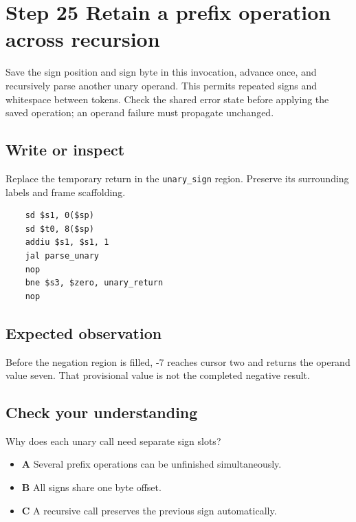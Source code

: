 \section{Step 25 Retain a prefix operation across recursion}\label{expression-s25}

Save the sign position and sign byte in this invocation, advance once, and recursively parse another unary operand. This permits repeated signs and whitespace between tokens. Check the shared error state before applying the saved operation; an operand failure must propagate unchanged.

\subsection{Write or inspect}
Replace the temporary return in the \texttt{unary\_sign} region. Preserve its surrounding labels and frame scaffolding.

\begin{verbatim}
    sd $s1, 0($sp)
    sd $t0, 8($sp)
    addiu $s1, $s1, 1
    jal parse_unary
    nop
    bne $s3, $zero, unary_return
    nop
\end{verbatim}
\subsection{Expected observation}
Before the negation region is filled, -7 reaches cursor two and returns the operand value seven. That provisional value is not the completed negative result.

\subsection{Check your understanding}
Why does each unary call need separate sign slots?

\begin{itemize}
  \item \textbf{A} Several prefix operations can be unfinished simultaneously.
  \item \textbf{B} All signs share one byte offset.
  \item \textbf{C} A recursive call preserves the previous sign automatically.
\end{itemize}

